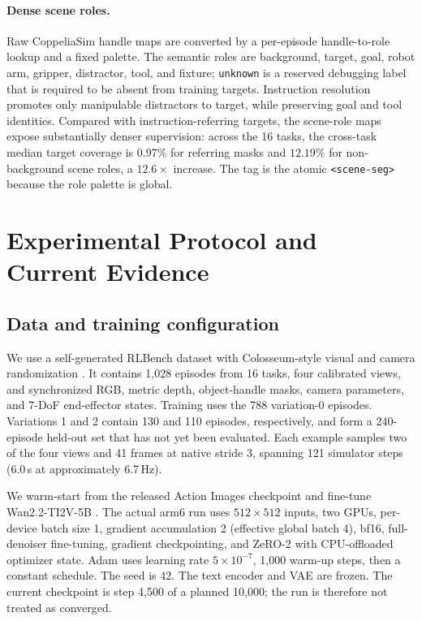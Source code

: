 \documentclass{article}
\newcommand{\code}[1]{\texttt{#1}}
\newcommand{\ptag}[1]{\texttt{<#1>}}
\begin{document}
\paragraph{Dense scene roles.}
Raw CoppeliaSim handle maps are converted by a per-episode handle-to-role lookup and a fixed
palette. The semantic roles are background, target, goal, robot arm, gripper, distractor, tool,
and fixture; \code{unknown} is a reserved debugging label that is required to be absent from
training targets. Instruction resolution promotes only manipulable distractors to target, while
preserving goal and tool identities. Compared with instruction-referring targets, the scene-role
maps expose substantially denser supervision: across the 16 tasks, the cross-task median target
coverage is $0.97\%$ for referring masks and $12.19\%$ for non-background scene roles, a
$12.6\times$ increase. The tag is the atomic \ptag{scene-seg} because the role palette is global.

\section{Experimental Protocol and Current Evidence}
\label{sec:experiments}

\subsection{Data and training configuration}

We use a self-generated RLBench dataset \citep{james2020rlbench} with Colosseum-style visual and
camera randomization \citep{pumacay2024colosseum}. It contains 1,028 episodes from 16 tasks, four
calibrated views, and synchronized RGB, metric depth, object-handle masks, camera parameters, and
7-DoF end-effector states. Training uses the 788 variation-0 episodes. Variations 1 and 2 contain
130 and 110 episodes, respectively, and form a 240-episode held-out set that has not yet been
evaluated. Each example samples two of the four views and 41 frames at native stride 3, spanning
121 simulator steps (6.0\,s at approximately 6.7\,Hz).

We warm-start from the released Action Images checkpoint and fine-tune Wan2.2-TI2V-5B
\citep{wan2025}. The actual arm6 run uses $512\times512$ inputs, two GPUs, per-device batch size
1, gradient accumulation 2 (effective global batch 4), bf16, full-denoiser fine-tuning, gradient
checkpointing, and ZeRO-2 with CPU-offloaded optimizer state. Adam uses learning rate
$5\times10^{-7}$, 1,000 warm-up steps, then a constant schedule. The seed is 42. The text
encoder and VAE are frozen. The current checkpoint is step 4,500 of a planned 10,000; the run is
therefore not treated as converged.
\end{document}
